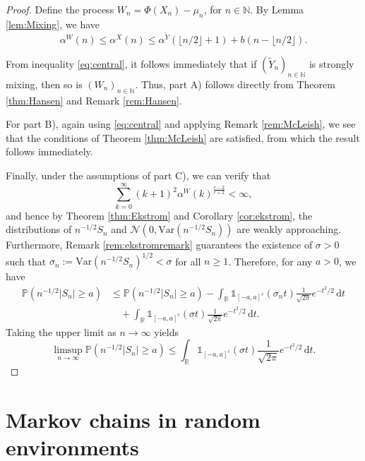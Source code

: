 \documentclass[a4paper,10pt]{article}
\newcommand{\N}{\mathbb{N}}
\newcommand{\R}{\mathbb{R}}
\renewcommand{\P}{\mathbb{P}}
\newcommand{\ind}{\mathds{1}}
\newcommand{\var}{\mathrm{Var}}
\newcommand{\dint}{\mathrm{d}}  %
\begin{document}
\begin{proof}
	Define the process $W_n = \Phi(X_n) - \mu_n$, for $n \in \N$. By Lemma \ref{lem:Mixing}, we have
	\begin{equation} \label{eq:central}
		\alpha^W(n) \le \alpha^X(n) \le \alpha^{\tilde{Y}}(\lfloor n/2 \rfloor + 1) + b(n - \lfloor n/2 \rfloor).
	\end{equation}
	
	From inequality \eqref{eq:central}, it follows immediately that if $(\tilde{Y}_n)_{n \in \N}$ is strongly mixing, then so is $(W_n)_{n \in \N}$. Thus, part A) follows directly from Theorem \ref{thm:Hansen} and Remark \ref{rem:Hansen}.
	
	For part B), again using \eqref{eq:central} and applying Remark \ref{rem:McLeish}, we see that the conditions of Theorem \ref{thm:McLeish} are satisfied, from which the result follows immediately.
	
	Finally, under the assumptions of part C), we can verify that
	$$
	\sum_{k=0}^{\infty}(k+1)^2 \alpha^W(k)^{\frac{r-2}{r+2}} < \infty,
	$$
	and hence by Theorem \ref{thm:Ekstrom} and Corollary \ref{cor:ekstrom}, the distributions of $n^{-1/2}S_n$ and $\mathcal{N}(0,\var(n^{-1/2}S_n))$ are weakly approaching. Furthermore, Remark \ref{rem:ekstromremark} guarantees the existence of $\sigma > 0$ such that $\sigma_n := \var(n^{-1/2}S_n)^{1/2} < \sigma$ for all $n \ge 1$. Therefore, for any $a > 0$, we have
	\begin{align*}
		\P(n^{-1/2}|S_n| \ge a) &\le \P(n^{-1/2}|S_n| \ge a) - \int_{\R} \ind_{[-a,a]^c}(\sigma_n t) \frac{1}{\sqrt{2\pi}} e^{-t^2/2} \, \mathrm{d}t \\
		&\quad + \int_{\R} \ind_{[-a,a]^c}(\sigma t) \frac{1}{\sqrt{2\pi}} e^{-t^2/2} \, \dint t.
	\end{align*}
	Taking the upper limit as $n \to \infty$ yields
	$$
	\limsup_{n \to \infty} \P(n^{-1/2}|S_n| \ge a) \le \int_{\R} \ind_{[-a,a]^c}(\sigma t) \frac{1}{\sqrt{2\pi}} e^{-t^2/2} \, \dint t.
	$$
	
\end{proof}



\section{Markov chains in random environments}\label{sec:MCRE}
\end{document}
